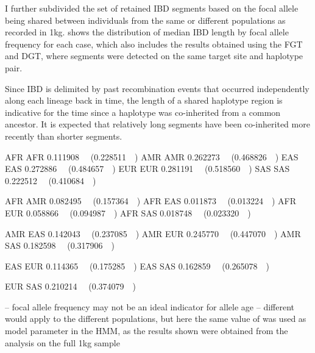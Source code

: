 I further subdivided the set of retained IBD segments based on the focal allele being shared between individuals from the same or different populations as recorded in \gls{1kg}.
 shows the distribution of median IBD length by focal allele frequency for each case, which also includes the results obtained using the FGT and DGT, where segments were detected on the same target site and haplotype pair.

Since IBD is delimited by past recombination events that occurred independently along each lineage back in time, the length of a shared haplotype region is indicative for the time since a haplotype was co-inherited from a common ancestor.
It is expected that relatively long segments have been co-inherited more recently than shorter segments.


AFR AFR  \SI{0.111908}{\mega\basepair} (\SI{0.228511}{\centi\morgan})
AMR AMR  \SI{0.262273}{\mega\basepair} (\SI{0.468826}{\centi\morgan})
EAS EAS  \SI{0.272886}{\mega\basepair} (\SI{0.484657}{\centi\morgan})
EUR EUR  \SI{0.281191}{\mega\basepair} (\SI{0.518560}{\centi\morgan})
SAS SAS  \SI{0.222512}{\mega\basepair} (\SI{0.410684}{\centi\morgan})

AFR AMR  \SI{0.082495}{\mega\basepair} (\SI{0.157364}{\centi\morgan})
AFR EAS  \SI{0.011873}{\mega\basepair} (\SI{0.013224}{\centi\morgan})
AFR EUR  \SI{0.058866}{\mega\basepair} (\SI{0.094987}{\centi\morgan})
AFR SAS  \SI{0.018748}{\mega\basepair} (\SI{0.023320}{\centi\morgan})

AMR EAS  \SI{0.142043}{\mega\basepair} (\SI{0.237085}{\centi\morgan})
AMR EUR  \SI{0.245770}{\mega\basepair} (\SI{0.447070}{\centi\morgan})
AMR SAS  \SI{0.182598}{\mega\basepair} (\SI{0.317906}{\centi\morgan})

EAS EUR  \SI{0.114365}{\mega\basepair} (\SI{0.175285}{\centi\morgan})
EAS SAS  \SI{0.162859}{\mega\basepair} (\SI{0.265078}{\centi\morgan})

EUR SAS  \SI{0.210214}{\mega\basepair} (\SI{0.374079}{\centi\morgan})


-- focal allele frequency may not be an ideal indicator for allele age
-- different \Ne would apply to the different populations, but here the same value of \Ne was used as model parameter in the HMM, as the results shown were obtained from the analysis on the full \gls{1kg} sample
























